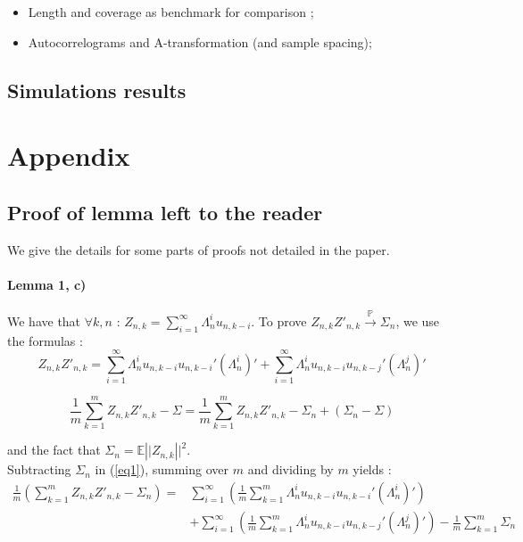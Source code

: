 \documentclass[11pt]{article}
\begin{document}
\begin{itemize}
\item Length and coverage as benchmark for comparison ;
\item Autocorrelograms and A-transformation (and sample spacing);
\end{itemize}


\subsection{Simulations results}







\newpage

\section{Appendix}


\subsection{Proof of lemma left to the reader}
We give the details for some parts of proofs not detailed in the paper.

\paragraph{Lemma 1, c)} We have that $\forall k, n$ : $Z_{n,k} = \sum_{i=1}^\infty \Lambda_n^i u_{n,k-i}$.
To prove $Z_{n,k}Z'_{n,k} \overset{\mathbb{P}}{\to}  \Sigma_n$, we use the formulas :
\begin{equation}\label{eq1}
 Z_{n,k}Z'_{n,k} = \sum^\infty_{i=1} \Lambda_n^i u_{n,k-i}u_{n,k-i}' (\Lambda_n^i)' + \sum^\infty_{i=1}  \Lambda_n^i u_{n,k-i}u_{n,k-j}' (\Lambda_n^j)'
\end{equation}

\begin{equation} \label{eq2}
\frac{1}{m} \sum_{k=1}^m Z_{n,k}Z'_{n,k} - \Sigma = \frac{1}{m} \sum_{k=1}^m Z_{n,k}Z'_{n,k}  - \Sigma_n + \left(\Sigma_n - \Sigma \right)
\end{equation}

and the fact that $\Sigma_n = \mathbb{E}\left||Z_{n,k}\right||^2$. \\

Subtracting $\Sigma_n$ in (\ref{eq1}), summing over $m$ and dividing by $m$ yields :
\begin{equation}
\begin{split}
\frac{1}{m} \left(\sum_{k=1}^m Z_{n,k}Z'_{n,k} - \Sigma_n \right) = & \sum_{i=1}^\infty  \left(\frac{1}{m} \sum_{k=1}^m  \Lambda_n^i u_{n,k-i}u_{n,k-i}' (\Lambda_n^i)' \right) \\
 & + \sum_{i=1}^\infty \left(\frac{1}{m} \sum^m_{k=1}  \Lambda_n^i u_{n,k-i}u_{n,k-j}' (\Lambda_n^j)'\right) - \frac{1}{m} \sum^m_{k=1}  \Sigma_n
\end{split}
\end{equation}
\end{document}
